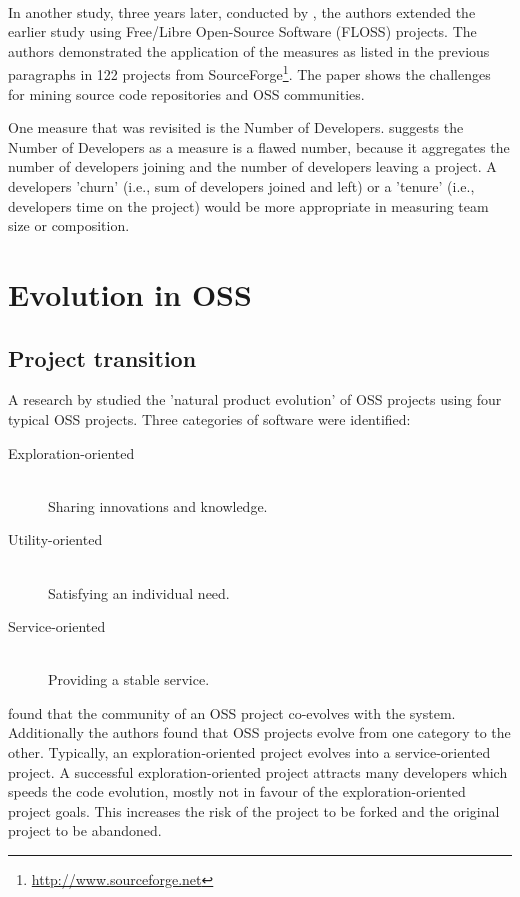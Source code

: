 \paragraph{}
In another study, three years later, conducted by \citet{crowston2006}, the
authors extended the earlier study using Free/Libre Open-Source Software (FLOSS)
projects. The authors demonstrated the application of the measures as listed in
the previous paragraphs in 122 projects from
SourceForge\footnote{\url{http://www.sourceforge.net}}.
The paper shows the challenges for mining source code repositories and OSS communities.

One measure that was revisited is the Number of Developers.
\citeauthor{crowston2006} suggests the Number of Developers as a measure is a
flawed number, because it aggregates the number of developers joining and the
number of developers leaving a project. A developers 'churn' (i.e.,
sum of developers joined and left) or a 'tenure' (i.e., developers time on the
project) would be more appropriate in measuring team size or composition.





\section{Evolution in OSS}
\subsection{Project transition}
A research by \citet{nakakoji} studied the 'natural product evolution' of OSS
projects using four typical OSS projects. Three categories of software were
identified:

\begin{description}
	\item[Exploration-oriented] \hfill \\ Sharing innovations and knowledge.
	\item[Utility-oriented] \hfill \\ Satisfying an individual need.
	\item[Service-oriented] \hfill \\ Providing a stable service.
\end{description}

\noindent
\citeauthor{nakakoji} found that the community of an OSS project co-evolves
with the system. Additionally the authors found that OSS projects evolve from
one category to the other. Typically, an exploration-oriented project evolves
into a service-oriented project. A successful exploration-oriented project
attracts many developers which speeds the code evolution, mostly not in favour
of the exploration-oriented project goals. This increases the risk of the
project to be forked and the original project to be abandoned.

